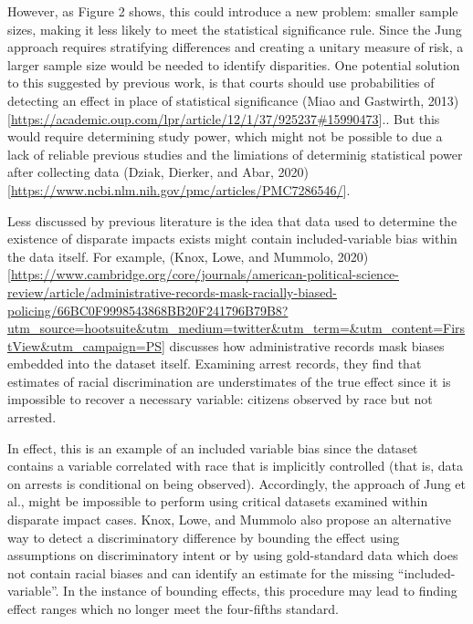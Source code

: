 \documentclass[
]{article}
\begin{document}
However, as Figure 2 shows, this could introduce a new problem: smaller
sample sizes, making it less likely to meet the statistical significance
rule. Since the Jung approach requires stratifying differences and
creating a unitary measure of risk, a larger sample size would be needed
to identify disparities. One potential solution to this suggested by
previous work, is that courts should use probabilities of detecting an
effect in place of statistical significance (Miao and Gastwirth,
2013){[}\url{https://academic.oup.com/lpr/article/12/1/37/925237\#15990473}{]}..
But this would require determining study power, which might not be
possible to due a lack of reliable previous studies and the limiations
of determinig statistical power after collecting data (Dziak, Dierker,
and Abar,
2020){[}\url{https://www.ncbi.nlm.nih.gov/pmc/articles/PMC7286546/}{]}.

Less discussed by previous literature is the idea that data used to
determine the existence of disparate impacts exists might contain
included-variable bias within the data itself. For example, (Knox, Lowe,
and Mummolo,
2020){[}\url{https://www.cambridge.org/core/journals/american-political-science-review/article/administrative-records-mask-racially-biased-policing/66BC0F9998543868BB20F241796B79B8?utm_source=hootsuite\&utm_medium=twitter\&utm_term=\&utm_content=FirstView\&utm_campaign=PS}{]}
discusses how administrative records mask biases embedded into the
dataset itself. Examining arrest records, they find that estimates of
racial discrimination are understimates of the true effect since it is
impossible to recover a necessary variable: citizens observed by race
but not arrested.

In effect, this is an example of an included variable bias since the
dataset contains a variable correlated with race that is implicitly
controlled (that is, data on arrests is conditional on being observed).
Accordingly, the approach of Jung et al., might be impossible to perform
using critical datasets examined within disparate impact cases. Knox,
Lowe, and Mummolo also propose an alternative way to detect a
discriminatory difference by bounding the effect using assumptions on
discriminatory intent or by using gold-standard data which does not
contain racial biases and can identify an estimate for the missing
``included-variable''. In the instance of bounding effects, this
procedure may lead to finding effect ranges which no longer meet the
four-fifths standard.
\end{document}
